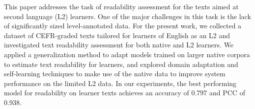 This paper addresses the task of readability assessment for the texts aimed at second language (L2) learners. One of the major challenges in this task is the lack of significantly sized level-annotated data. For the present work, we collected a dataset of CEFR-graded texts tailored for learners of English as an L2 and investigated text readability assessment for both native and L2 learners. We applied a generalization method to adapt models trained on larger native corpora to estimate text readability for learners, and explored domain adaptation and self-learning techniques to make use of the native data to improve system performance on the limited L2 data. In our experiments, the best performing model for readability on learner texts achieves an accuracy of 0.797 and PCC of 0.938.
